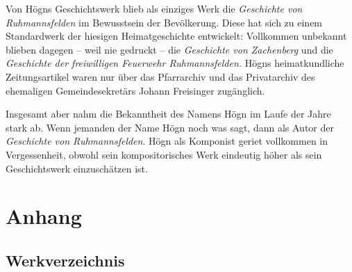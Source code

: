 \documentclass{book}
\begin{document}
Von Högns Geschichtswerk blieb als einziges Werk die \textit{Geschichte
von Ruh\-mannsfelden} im Bewusstsein der Bevölkerung. Diese hat sich zu
einem Stan\-dardwerk der hiesigen Heimatgeschichte entwickelt:
Vollkommen unbekannt blieben dagegen – weil nie gedruckt – die
\textit{Geschichte von Zachenberg} und die \textit{Geschichte der
freiwilligen Feuerwehr Ruhmannsfelden.} Högns heimatkundliche
Zei\-tungsartikel waren nur über das Pfarrarchiv und das Privatarchiv
des ehema\-ligen Gemeindesekretärs Johann Freisinger zugänglich.

Insgesamt aber nahm die Bekanntheit des Namens Högn im Laufe der Jahre
stark ab. Wenn jemanden der Name Högn noch was sagt, dann als Au\-tor
der \textit{Geschichte von Ruhmannsfelden}. Högn als Komponist geriet
vollkommen in Vergessenheit, obwohl sein kompositorisches Werk
eindeutig höher als sein Geschichtswerk einzuschätzen ist.





\chapter{Anhang}
\section{Werkverzeichnis}
\end{document}
